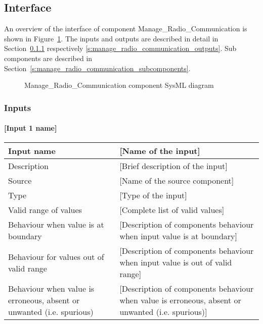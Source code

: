 \subsection{Interface}

An overview of the interface of component Manage\_Radio\_Communication is shown in Figure~\ref{f:manage_radio_communication_interface}. The inputs and outputs are described in detail in Section~\ref{s:manage_radio_communication_inputs} respectively \ref{s:manage_radio_communication_outputs}. Sub components are described in Section~\ref{s:manage_radio_communication_subcomponents}.

\begin{figure}
\center
{}
\caption{Manage\_Radio\_Communication component SysML diagram}\label{f:manage_radio_communication_interface}
\end{figure}


\subsubsection{Inputs}\label{s:manage_radio_communication_inputs}

\paragraph{[Input 1 name]}

\begin{longtable}{p{}p{}}
\toprule
Input name				& [Name of the input] \\
\midrule
Description				& [Brief description of the input] \\
\midrule
Source					& [Name of the source component] \\ 
\midrule
Type					& [Type of the input] \\
\midrule
Valid range of values	& [Complete list of valid values] \\
\midrule
Behaviour when value is at boundary	& [Description of components behaviour when input value is at boundary] \\
\midrule
Behaviour for values out of valid range	& [Description of components behaviour when input value is out of valid range] \\
\midrule
Behaviour when value is erroneous, absent or unwanted (i.e. spurious) & [Description of components behaviour when value is erroneous, absent or unwanted (i.e. spurious)] \\
\bottomrule
\end{longtable}


